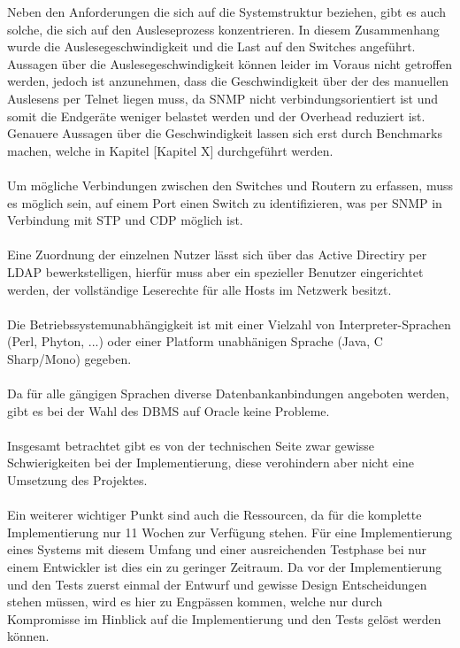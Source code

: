 Neben den Anforderungen die sich auf die Systemstruktur beziehen, gibt es auch solche, die sich auf den Ausleseprozess konzentrieren.
In diesem Zusammenhang wurde die Auslesegeschwindigkeit und die Last auf den Switches angeführt.
Aussagen über die Auslesegeschwindigkeit können leider im Voraus nicht getroffen werden, jedoch ist anzunehmen, dass die Geschwindigkeit über der des manuellen Auslesens per Telnet liegen muss, da SNMP nicht verbindungsorientiert ist und somit die Endgeräte weniger belastet werden und der Overhead reduziert ist.
Genauere Aussagen über die Geschwindigkeit lassen sich erst durch Benchmarks machen, welche in Kapitel [Kapitel X] durchgeführt werden.\\\\
Um mögliche Verbindungen zwischen den Switches und Routern zu erfassen, muss es möglich sein, auf einem Port einen Switch zu identifizieren, was per SNMP in Verbindung mit STP und CDP möglich ist.\\\\
Eine Zuordnung der einzelnen Nutzer lässt sich über das Active Directiry per LDAP bewerkstelligen, hierfür muss aber ein spezieller Benutzer eingerichtet werden, der vollständige Leserechte für alle Hosts im Netzwerk besitzt.\\\\
Die Betriebssystemunabhängigkeit ist mit einer Vielzahl von Interpreter-Sprachen (Perl, Phyton, ...) oder einer Platform unabhänigen Sprache (Java, C Sharp/Mono) gegeben.\\\\
Da für alle gängigen Sprachen diverse Datenbankanbindungen angeboten werden, gibt es bei der Wahl des DBMS auf Oracle keine Probleme.\\\\
Insgesamt betrachtet gibt es von der technischen Seite zwar gewisse Schwierigkeiten bei der Implementierung, diese verohindern aber nicht eine Umsetzung des Projektes.\\\\
Ein weiterer wichtiger Punkt sind auch die Ressourcen, da für die komplette Implementierung nur 11 Wochen zur Verfügung stehen.
Für eine Implementierung eines Systems mit diesem Umfang und einer ausreichenden Testphase bei nur einem Entwickler ist dies ein zu geringer Zeitraum.
Da vor der Implementierung und den Tests zuerst einmal der Entwurf und gewisse Design Entscheidungen stehen müssen, wird es hier zu Engpässen kommen, welche nur durch Kompromisse im Hinblick auf die Implementierung und den Tests gelöst werden können.\\\\

